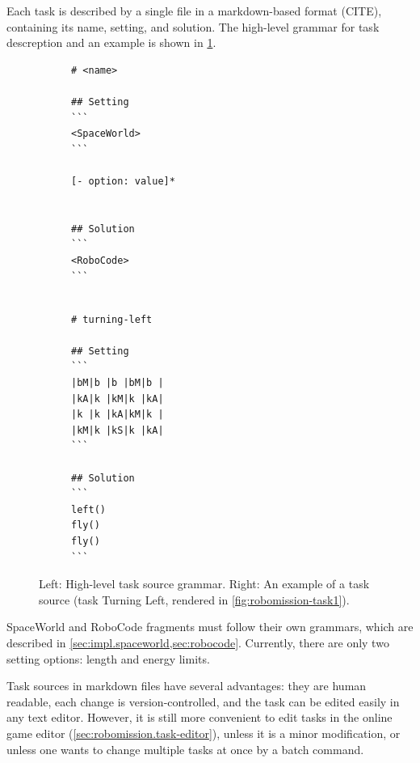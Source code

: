 Each task is described by a single file in a markdown-based format (CITE),
containing its name, setting, and solution.
The high-level grammar for task descreption and an example is shown in
\cref{fig:task-source}.

\begin{figure}[htb]
\centering
\begin{subfigure}{.49\textwidth}
{\lstset{numbers=none, showlines=true}
\begin{lstlisting}
# <name>

## Setting
```
<SpaceWorld>
```

[- option: value]*


## Solution
```
<RoboCode>
```


\end{lstlisting}}
\end{subfigure}
\begin{subfigure}{.49\textwidth}
{\lstset{numbers=none}
\begin{lstlisting}
# turning-left

## Setting
```
|bM|b |b |bM|b |
|kA|k |kM|k |kA|
|k |k |kA|kM|k |
|kM|k |kS|k |kA|
```

## Solution
```
left()
fly()
fly()
```
\end{lstlisting}}
\end{subfigure}
\caption{%
  Left: High-level task source grammar.
  Right: An example of a task source
  (task Turning Left, rendered in \cref{fig:robomission-task1}).}
\label{fig:task-source}
\end{figure}

SpaceWorld and RoboCode fragments must follow their own grammars, which
are described in \cref{sec:impl.spaceworld,sec:robocode}.
Currently, there are only two setting options: length and energy limits.


Task sources in markdown files have several advantages:
they are human readable,  %
each change is version-controlled,
and the task can be edited easily in any text editor.
However, it is still more convenient to edit tasks in the online game editor
(\cref{sec:robomission.task-editor}),
unless it is a minor modification,
or unless one wants to change multiple tasks at once by a batch command.

